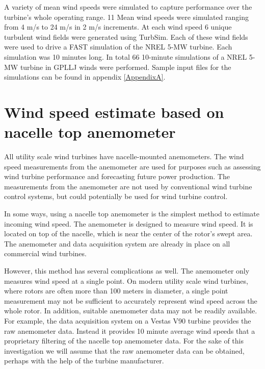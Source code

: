 A variety of mean wind speeds were simulated to capture performance over the turbine’s whole operating range. 11 Mean wind speeds were simulated ranging from 4 m/s to 24 m/s in 2 m/s increments. At each wind speed 6 unique turbulent wind fields were generated using TurbSim. Each of these wind fields were used to drive a FAST simulation of the NREL 5-MW turbine. Each simulation was 10 minutes long. In total 66 10-minute simulations of a NREL 5-MW turbine in GPLLJ winds were performed.  Sample input files for the simulations can be found in appendix \ref{AppendixA}.






\section{Wind speed estimate based on nacelle top anemometer}

All utility scale wind turbines have nacelle-mounted anemometers. The wind speed measurements from the anemometer are used for purposes such as assessing wind turbine performance and forecasting future power production. The measurements from the anemometer are not used by conventional wind turbine control systems, but could potentially be used for wind turbine control.

In some ways, using a nacelle top anemometer is the simplest method to estimate incoming wind speed. The anemometer is designed to measure wind speed. It is located on top of the nacelle, which is near the center of the rotor’s swept area. The anemometer and data acquisition system are already in place on all commercial wind turbines. 

However, this method has several complications as well. The anemometer only measures wind speed at a single point. On modern utility scale wind turbines, where rotors are often more than 100 meters in diameter, a single point measurement may not be sufficient to accurately represent wind speed across the whole rotor. In addition, suitable anemometer data may not be readily available. For example, the data acquisition system on a Vestas V90 turbine provides the raw anemometer data. Instead it provides 10 minute average wind speeds that a proprietary filtering of the nacelle top anemometer data. For the sake of this investigation we will assume that the raw anemometer data can be obtained, perhaps with the help of the turbine manufacturer.

